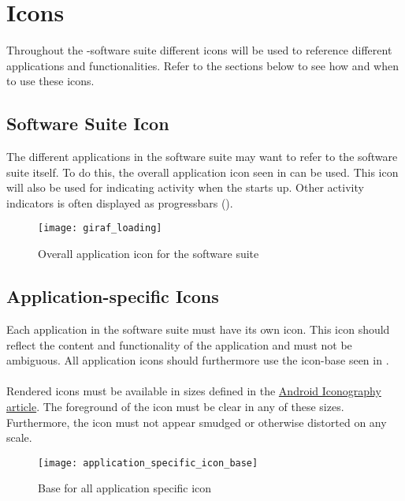 
\chapter{Icons}
\label{cha:icons}

Throughout the \giraf-software suite different icons will be used to reference different applications and functionalities. Refer to the sections below to see how and when to use these icons.

\section{\giraf Software Suite Icon}
The different applications in the \giraf software suite may want to refer to the software suite itself. To do this, the overall application icon seen in  can be used. This icon will also be used for indicating activity when the \launcher starts up. Other activity indicators is often displayed as progressbars ().

\begin{figure}[h]
	\centering
	\texttt{[image: giraf\_loading]}
	\caption{Overall application icon for the \giraf software suite}
	\label{fig:overall_application_icon}
\end{figure}

\section{Application-specific Icons}
Each application in the \giraf software suite must have its own icon. This icon should reflect the content and functionality of the application and must not be ambiguous. All application icons should furthermore use the icon-base seen in . 
\\\\
Rendered icons must be available in sizes defined in the \href{http://developer.android.com/design/style/iconography.html}{Android Iconography article}. The foreground of the icon must be clear in any of these sizes. Furthermore, the icon must not appear smudged or otherwise distorted on any scale.

\begin{figure}[h]
	\centering
	\texttt{[image: application\_specific\_icon\_base]}
	\caption{Base for all application specific icon}
	\label{fig:application_specific_icon_base}
\end{figure}

